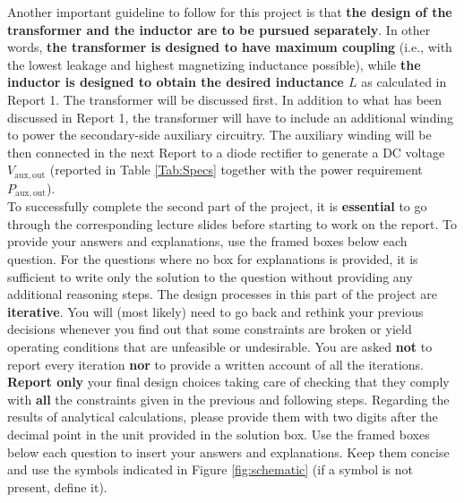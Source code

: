 \documentclass{PELsmallreport}
\begin{document}
Another important guideline to follow for this project is that \textbf{the design of the transformer and the inductor are to be pursued separately}. 
In other words, \textbf{the transformer is designed to have maximum coupling} (i.e., with the lowest leakage and highest magnetizing inductance possible), while \textbf{the inductor is designed to obtain the desired inductance $L$} as calculated in Report 1. 
The transformer will be discussed first. 
In addition to what has been discussed in Report 1, the transformer will have to include an additional winding to power the secondary-side auxiliary circuitry. 
The auxiliary winding will be then connected in the next Report to a diode rectifier to generate a DC voltage $V_\mathrm{aux,out}$ 
(reported in Table \ref{Tab:Specs} together with the power requirement $P_\mathrm{aux,out}$). 
\\


To successfully complete the second part of the project, it is \textbf{essential} to go through the corresponding lecture slides before starting to work on the report. 
To provide your answers and explanations, use the framed boxes below each question. 
For the questions where no box for explanations is provided, it is sufficient to write only the solution to the question without providing any additional reasoning steps. 
The design processes in this part of the project are \textbf{iterative}. 
You will (most likely) need to go back and rethink your previous decisions whenever you find out that some constraints are broken or yield operating conditions that are unfeasible or undesirable. 
You are asked \textbf{not} to report every iteration \textbf{nor} to provide a written account of all the iterations. 
\textbf{Report only} your final design choices taking care of checking that they comply with \textbf{all} the constraints given in the previous and following steps.
Regarding the results of analytical calculations, please provide them with two digits after the decimal point in the unit provided in the solution box. Use the framed boxes below each question to insert your answers and explanations. 
Keep them concise and use the symbols indicated in Figure \ref{fig:schematic} (if a symbol is not present, define it). 
\\
\end{document}
